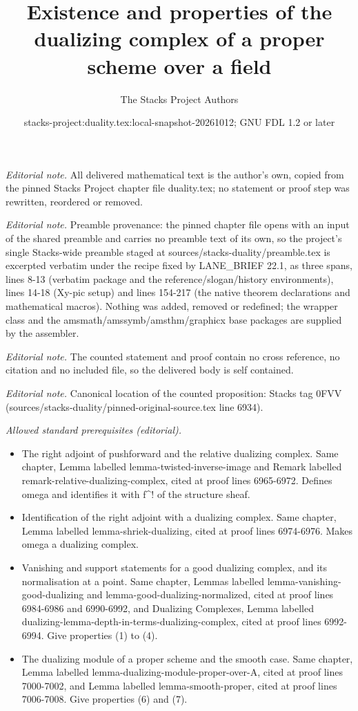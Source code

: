 \documentclass[10pt,a4paper]{amsart}
\title{Existence and properties of the dualizing complex of a proper scheme over a field}
\author{The Stacks Project Authors}
\date{stacks-project:duality.tex:local-snapshot-20261012; GNU FDL 1.2 or later}
\theoremstyle{plain}
\theoremstyle{definition}
\theoremstyle{remark}
\numberwithin{equation}{subsection}
\begin{document}
\maketitle
\noindent\textit{Editorial note.} All delivered mathematical text is the author's own, copied from the pinned Stacks Project chapter file duality.tex; no statement or proof step was rewritten, reordered or removed.\par\medskip
\noindent\textit{Editorial note.} Preamble provenance: the pinned chapter file opens with an input of the shared preamble and carries no preamble text of its own, so the project's single Stacks-wide preamble staged at sources/stacks-duality/preamble.tex is excerpted verbatim under the recipe fixed by LANE\_BRIEF 22.1, as three spans, lines 8-13 (verbatim package and the reference/slogan/history environments), lines 14-18 (Xy-pic setup) and lines 154-217 (the native theorem declarations and mathematical macros). Nothing was added, removed or redefined; the wrapper class and the amsmath/amssymb/amsthm/graphicx base packages are supplied by the assembler.\par\medskip
\noindent\textit{Editorial note.} The counted statement and proof contain no cross reference, no citation and no included file, so the delivered body is self contained.\par\medskip
\noindent\textit{Editorial note.} Canonical location of the counted proposition: Stacks tag 0FVV (sources/stacks-duality/pinned-original-source.tex line 6934).\par\medskip
\noindent\textit{Allowed standard prerequisites (editorial).}\begin{itemize}
\item The right adjoint of pushforward and the relative dualizing complex. Same chapter, Lemma labelled lemma-twisted-inverse-image and Remark labelled remark-relative-dualizing-complex, cited at proof lines 6965-6972. Defines omega and identifies it with f\textasciicircum{}! of the structure sheaf.
\item Identification of the right adjoint with a dualizing complex. Same chapter, Lemma labelled lemma-shriek-dualizing, cited at proof lines 6974-6976. Makes omega a dualizing complex.
\item Vanishing and support statements for a good dualizing complex, and its normalisation at a point. Same chapter, Lemmas labelled lemma-vanishing-good-dualizing and lemma-good-dualizing-normalized, cited at proof lines 6984-6986 and 6990-6992, and Dualizing Complexes, Lemma labelled dualizing-lemma-depth-in-terms-dualizing-complex, cited at proof lines 6992-6994. Give properties (1) to (4).
\item The dualizing module of a proper scheme and the smooth case. Same chapter, Lemma labelled lemma-dualizing-module-proper-over-A, cited at proof lines 7000-7002, and Lemma labelled lemma-smooth-proper, cited at proof lines 7006-7008. Give properties (6) and (7).
\end{itemize}\medskip
\end{document}
